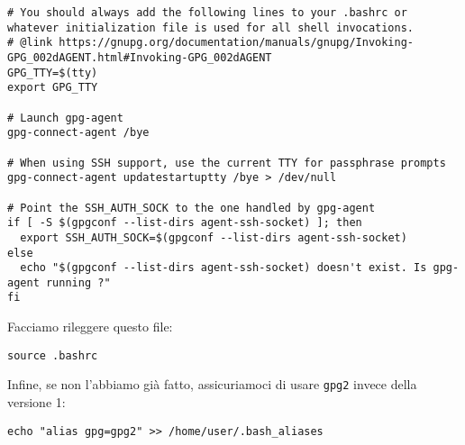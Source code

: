 \begin{lstlisting}
# You should always add the following lines to your .bashrc or whatever initialization file is used for all shell invocations.
# @link https://gnupg.org/documentation/manuals/gnupg/Invoking-GPG_002dAGENT.html#Invoking-GPG_002dAGENT
GPG_TTY=$(tty)
export GPG_TTY

# Launch gpg-agent
gpg-connect-agent /bye

# When using SSH support, use the current TTY for passphrase prompts
gpg-connect-agent updatestartuptty /bye > /dev/null

# Point the SSH_AUTH_SOCK to the one handled by gpg-agent
if [ -S $(gpgconf --list-dirs agent-ssh-socket) ]; then
  export SSH_AUTH_SOCK=$(gpgconf --list-dirs agent-ssh-socket)
else
  echo "$(gpgconf --list-dirs agent-ssh-socket) doesn't exist. Is gpg-agent running ?"
fi
\end{lstlisting}

Facciamo rileggere questo file:

\begin{lstlisting}
source .bashrc
\end{lstlisting}

Infine, se non l'abbiamo già fatto, assicuriamoci di usare \texttt{gpg2} invece
della versione 1:

\begin{lstlisting}
echo "alias gpg=gpg2" >> /home/user/.bash_aliases
\end{lstlisting}
